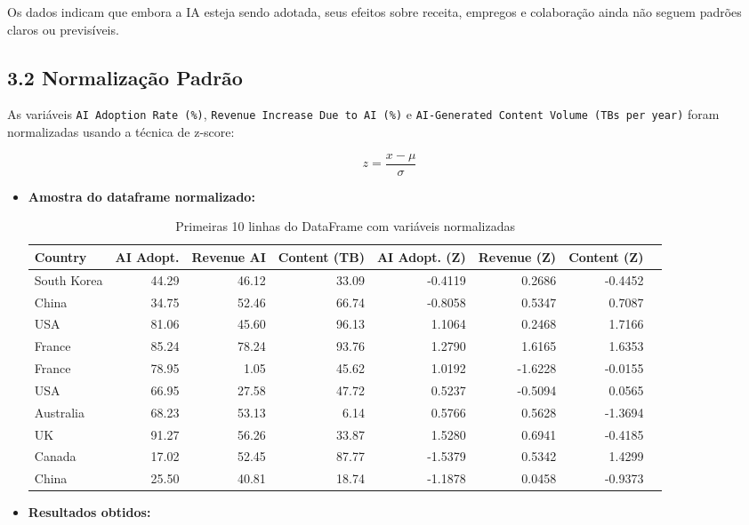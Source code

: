 \documentclass[12pt]{article}
\begin{document}
Os dados indicam que embora a IA esteja sendo adotada, seus efeitos sobre receita, empregos e colaboração ainda não seguem padrões claros ou previsíveis.

\subsection*{3.2 Normalização Padrão}

As variáveis \texttt{AI Adoption Rate (\%)},
\texttt{Revenue Increase Due to AI (\%)} e 
\texttt{AI-Generated Content Volume (TBs per year)} foram normalizadas usando a técnica de z-score:

\begin{equation}
z = \frac{x - \mu}{\sigma}
\end{equation}

\begin{itemize}
    \item \textbf{Amostra do dataframe normalizado:}
    \begin{table}[H]
    \centering
    \begin{adjustbox}{max width=\textwidth}
    \begin{tabular}{lrrrrrrr}
    \toprule
    Country & AI Adopt. & Revenue AI & Content (TB) & AI Adopt. (Z) & Revenue (Z) & Content (Z) \\
    \midrule
    South Korea & 44.29 & 46.12 & 33.09 & -0.4119 & 0.2686 & -0.4452 \\
    China       & 34.75 & 52.46 & 66.74 & -0.8058 & 0.5347 &  0.7087 \\
    USA         & 81.06 & 45.60 & 96.13 &  1.1064 & 0.2468 &  1.7166 \\
    France      & 85.24 & 78.24 & 93.76 &  1.2790 & 1.6165 &  1.6353 \\
    France      & 78.95 &  1.05 & 45.62 &  1.0192 & -1.6228 & -0.0155 \\
    USA         & 66.95 & 27.58 & 47.72 &  0.5237 & -0.5094 &  0.0565 \\
    Australia   & 68.23 & 53.13 &  6.14 &  0.5766 & 0.5628 & -1.3694 \\
    UK          & 91.27 & 56.26 & 33.87 &  1.5280 & 0.6941 & -0.4185 \\
    Canada      & 17.02 & 52.45 & 87.77 & -1.5379 & 0.5342 &  1.4299 \\
    China       & 25.50 & 40.81 & 18.74 & -1.1878 & 0.0458 & -0.9373 \\
    \bottomrule
    \end{tabular}
    \end{adjustbox}
    \caption{Primeiras 10 linhas do DataFrame com variáveis normalizadas}
    \end{table}
    \item \textbf{Resultados obtidos:}
    

\end{itemize}
\end{document}

